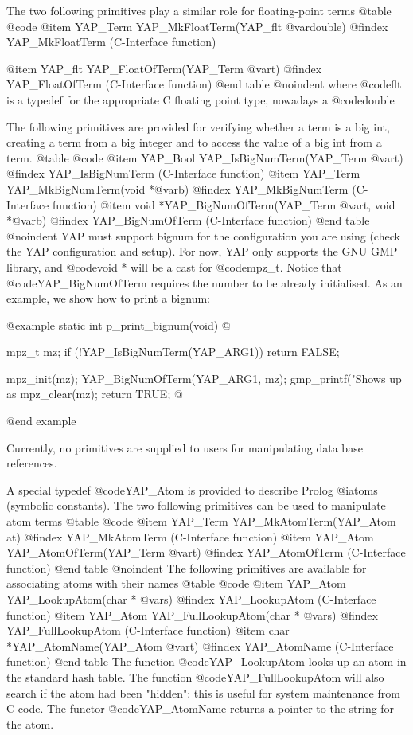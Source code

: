 The two following primitives play a similar role for floating-point terms
@table @code
@item      YAP_Term YAP_MkFloatTerm(YAP_flt @var{double})
@findex YAP_MkFloatTerm (C-Interface function)

@item     YAP_flt  YAP_FloatOfTerm(YAP_Term @var{t})
@findex YAP_FloatOfTerm (C-Interface function)
@end table
@noindent
where @code{flt} is a typedef for the appropriate C floating point type,
nowadays a @code{double}

The following primitives are provided for verifying whether a term is
a big int, creating a term from a big integer and to access the value
of a big int from a term.
@table @code
@item      YAP_Bool YAP_IsBigNumTerm(YAP_Term @var{t})
@findex YAP_IsBigNumTerm (C-Interface function)
@item      YAP_Term YAP_MkBigNumTerm(void  *@var{b})
@findex YAP_MkBigNumTerm (C-Interface function)
@item      void *YAP_BigNumOfTerm(YAP_Term @var{t}, void *@var{b})
@findex YAP_BigNumOfTerm (C-Interface function)
@end table
@noindent
YAP must support bignum for the configuration you are using (check the
YAP configuration and setup). For now, YAP only supports the GNU GMP
library, and @code{void *} will be a cast for @code{mpz_t}. Notice
that @code{YAP_BigNumOfTerm} requires the number to be already
initialised. As an example, we show how to print a bignum:

@example
static int
p_print_bignum(void)
@{
  mpz_t mz;
  if (!YAP_IsBigNumTerm(YAP_ARG1))
    return FALSE;

  mpz_init(mz);
  YAP_BigNumOfTerm(YAP_ARG1, mz);
  gmp_printf("Shows up as %
  mpz_clear(mz);
  return TRUE;
@}
@end example


Currently, no primitives are supplied to users for manipulating data base
references. 

A special typedef @code{YAP_Atom} is provided to describe Prolog
@i{atoms} (symbolic constants). The two following primitives can be used
to manipulate atom terms
@table @code
 @item     YAP_Term YAP_MkAtomTerm(YAP_Atom at)
@findex YAP_MkAtomTerm (C-Interface function)
 @item     YAP_Atom YAP_AtomOfTerm(YAP_Term @var{t})
@findex YAP_AtomOfTerm (C-Interface function)
@end table
@noindent
The following primitives are available for associating atoms with their
names 
@table @code
 @item     YAP_Atom  YAP_LookupAtom(char * @var{s})
@findex YAP_LookupAtom (C-Interface function)
 @item     YAP_Atom  YAP_FullLookupAtom(char * @var{s})
@findex YAP_FullLookupAtom (C-Interface function)
 @item     char     *YAP_AtomName(YAP_Atom @var{t})
@findex YAP_AtomName (C-Interface function)
@end table
The function @code{YAP_LookupAtom} looks up an atom in the standard hash
table. The function @code{YAP_FullLookupAtom} will also search if the
atom had been "hidden": this is useful for system maintenance from C
code. The functor @code{YAP_AtomName} returns a pointer to the string
for the atom.

